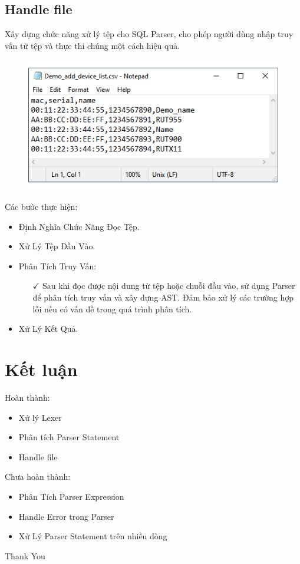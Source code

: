\documentclass{beamer}
\begin{document}
	\subsection{Handle file}
	\begin{frame}
		\begin{tcolorbox}[colback=yellow!10!white,colframe=red!75!black,title= Mục tiêu]
			Xây dựng chức năng xử lý tệp cho SQL Parser, cho phép người dùng nhập truy vấn từ tệp và thực thi chúng một cách hiệu quả.
		\end{tcolorbox}
		\begin{figure}
			\centering
			\includegraphics[width=0.7\linewidth]{csvfile}
			\label{fig:csvfile}
		\end{figure}
	\end{frame}
	
	\begin{frame}
		Các bước thực hiện:
		\begin{itemize}
			\item Định Nghĩa Chức Năng Đọc Tệp.
			\item Xử Lý Tệp Đầu Vào.
			\item Phân Tích Truy Vấn:
			\begin{itemize}
				\item[$\checkmark$] Sau khi đọc được nội dung từ tệp hoặc chuỗi đầu vào, sử dụng Parser để phân tích truy vấn và xây dựng AST. Đảm bảo xử lý các trường hợp lỗi nếu có vấn đề trong quá trình phân tích.
			\end{itemize}
			\item Xử Lý Kết Quả.
		\end{itemize}
	\end{frame}
	
	\section{Kết luận}
	\begin{frame}
		Hoàn thành:
		\begin{itemize}
			\item Xử lý Lexer
			\item Phân tích Parser Statement
			\item Handle file
		\end{itemize}
		Chưa hoàn thành:
		\begin{itemize}
			\item Phân Tích Parser Expression
			\item Handle Error trong Parser
			\item Xử Lý Parser Statement trên nhiều dòng
		\end{itemize}
	\end{frame}
	
	\begin{frame}
		\begin{center}
			{\Huge\calligra Thank You}
		\end{center}
	\end{frame}
	
\end{document}
